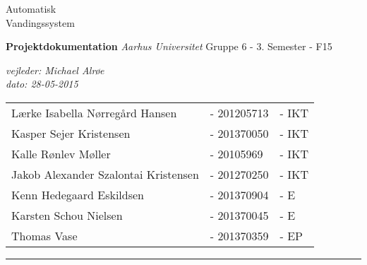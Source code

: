 
\begin{titlingpage}

\noindent
\titlefont Automatisk \\[0.7\baselineskip] Vandingssystem\par
\epigraph{
\textbf{Projektdokumentation}\newline
\textit{Aarhus Universitet}\newline
Gruppe 6 - 3. Semester - F15\newline
}%
{\textit{vejleder: Michael Alrøe}\\
\textit{dato: 28-05-2015}}
\null\vfill
\vspace*{1cm}
\noindent

\begin{minipage}{0.64\linewidth}
    \begin{flushleft}
		\normalsize
		\begin{tabular}{l l l}
 			  Lærke Isabella Nørregård Hansen 		&- 201205713 	&- IKT \\
			  Kasper Sejer Kristensen				&- 201370050	&- IKT \\
			  Kalle Rønlev Møller					&- 20105969		&- IKT \\
			  Jakob Alexander Szalontai Kristensen	&- 201270250	&- IKT \\
			  Kenn Hedegaard Eskildsen				&- 201370904	&- E   \\
			  Karsten Schou Nielsen					&- 201370045	&- E   \\
			  Thomas Vase							&- 201370359	&- EP
		\end{tabular}
    \end{flushleft}
\end{minipage}
%
\begin{minipage}{0.02\linewidth}
    \rule{1pt}{90pt}
\end{minipage}
\titlepagedecoration
\end{titlingpage}
